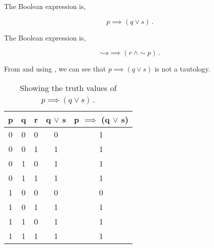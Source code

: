 \begin{subquestions}
\subquestion

\begin{subsubquestions}
	
\subsubquestion

The Boolean expression is,

\begin{equation}
	p \implies (q \lor s)\,.
\end{equation}

\subsubquestion

The Boolean expression is,

\begin{equation}
	\sim s \implies (r ~\land \sim p)\,.
\end{equation}

\subsubquestion

From  and using , we can see that $p \implies (q \lor s)$ is not a tautology.

\begin{table}[ht]
	\centering
	\begin{tabular}{|c|c|c|c|c|}
		\hline
		p & q & r & q $\lor$ s & p $\implies$ (q $\lor$ s) \\
		\hline
		0 & 0 & 0 & 0 & 1 \\
		0 & 0 & 1 & 1 & 1 \\
		0 & 1 & 0 & 1 & 1 \\
		0 & 1 & 1 & 1 & 1 \\
		1 & 0 & 0 & 0 & 0 \\
		1 & 0 & 1 & 1 & 1 \\
		1 & 1 & 0 & 1 & 1 \\
		1 & 1 & 1 & 1 & 1 \\
		\hline
	\end{tabular}
	\caption{\label{2016:q1:tab:TruthTab2} Showing the truth values of $p \implies (q \lor s)$\,.}
\end{table}

\end{subsubquestions}

\end{subquestions}

